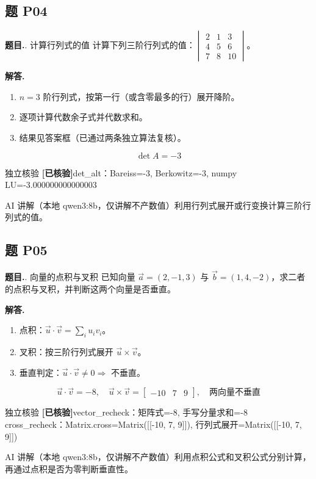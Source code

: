 \documentclass[11pt]{article}
\newcommand{\okmark}{\textcolor{okgreen}{\textbf{[已核验]}}}
\begin{document}
\subsection*{题 P04}
\noindent\textbf{题目.}. 计算行列式的值
计算下列三阶行列式的值：$\begin{vmatrix} 2 & 1 & 3 \\ 4 & 5 & 6 \\ 7 & 8 & 10 \end{vmatrix}$。\par
\vspace{4pt}\noindent\textbf{解答.}\quad
\begin{enumerate}[leftmargin=1.6em,itemsep=2pt]
  \item $n=3$ 阶行列式，按第一行（或含零最多的行）展开降阶。
  \item 逐项计算代数余子式并代数求和。
  \item 结果见答案框（已通过两条独立算法复核）。
\end{enumerate}
\[ \boxed{\det A=-3} \]
\par
\begin{veribox}{独立核验 \okmark}det\_alt：Bareiss=-3, Berkowitz=-3, numpy LU=-3.000000000000003\end{veribox}
\begin{aibox}{AI 讲解（本地 qwen3:8b，仅讲解不产数值）}利用行列式展开或行变换计算三阶行列式的值。\end{aibox}
\vspace{10pt}
\subsection*{题 P05}
\noindent\textbf{题目.}. 向量的点积与叉积
已知向量 $\vec{a}=(2,-1,3)$ 与 $\vec{b}=(1,4,-2)$，求二者的点积与叉积，并判断这两个向量是否垂直。\par
\vspace{4pt}\noindent\textbf{解答.}\quad
\begin{enumerate}[leftmargin=1.6em,itemsep=2pt]
  \item 点积：$\vec{u}\cdot\vec{v}=\sum_i u_i v_i$。
  \item 叉积：按三阶行列式展开 $\vec{u}\times\vec{v}$。
  \item 垂直判定：$\vec{u}\cdot\vec{v}\neq 0 \Rightarrow$ 不垂直。
\end{enumerate}
\[ \boxed{\vec{u}\cdot\vec{v}=-8,\quad \vec{u}\times\vec{v}=\left[\begin{matrix}-10 & 7 & 9\end{matrix}\right],\quad \text{两向量不垂直}} \]
\par
\begin{veribox}{独立核验 \okmark}vector\_recheck：矩阵式=-8, 手写分量求和=-8\\cross\_recheck：Matrix.cross=Matrix([[-10, 7, 9]]), 行列式展开=Matrix([[-10, 7, 9]])\end{veribox}
\begin{aibox}{AI 讲解（本地 qwen3:8b，仅讲解不产数值）}利用点积公式和叉积公式分别计算，再通过点积是否为零判断垂直性。\end{aibox}
\vspace{10pt}
\end{document}
